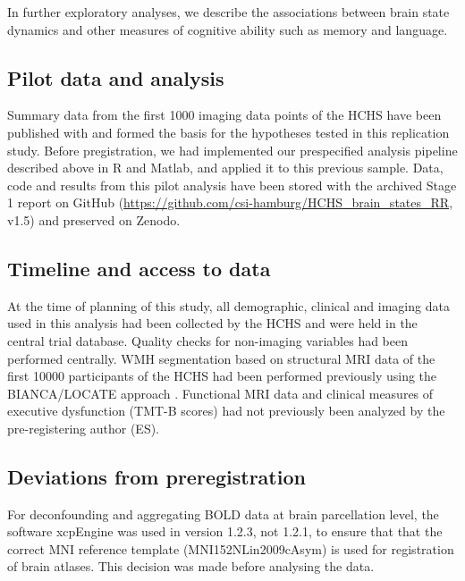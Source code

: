 In further exploratory analyses, we describe the associations between brain state dynamics and other measures of cognitive ability such as memory and language.

\subsection{Pilot data and analysis}
Summary data from the first \num{1000} imaging data points of the HCHS have been published with \citep{Schlemm2022-he}  and formed the basis for the hypotheses tested in this replication study.
Before pregistration, we had implemented our prespecified analysis pipeline described above in R and Matlab, and applied it to this previous sample.
Data, code and results from this pilot analysis have been stored with the archived Stage 1 report on GitHub (\url{https://github.com/csi-hamburg/HCHS_brain_states_RR}, v1.5) and preserved on Zenodo.

\subsection{Timeline and access to data}
At the time of planning of this study, all demographic, clinical and imaging data used in this analysis had been collected by the HCHS and were held in the central trial database.
Quality checks for non-imaging variables had been performed centrally.
WMH segmentation based on structural MRI data of the first \num{10000} participants of the HCHS had been performed previously using the BIANCA/LOCATE approach \citep{Rimmele2022-bz}.
Functional MRI data and clinical measures of executive dysfunction (TMT-B scores) had not previously been analyzed by the pre-registering author (ES).

\subsection{Deviations from preregistration}
For deconfounding and aggregating BOLD data at brain parcellation level, the software xcpEngine was used in version 1.2.3, not 1.2.1, to ensure that that the correct MNI reference template (MNI152NLin2009cAsym) is used for registration of brain atlases. This decision was made before analysing the data.